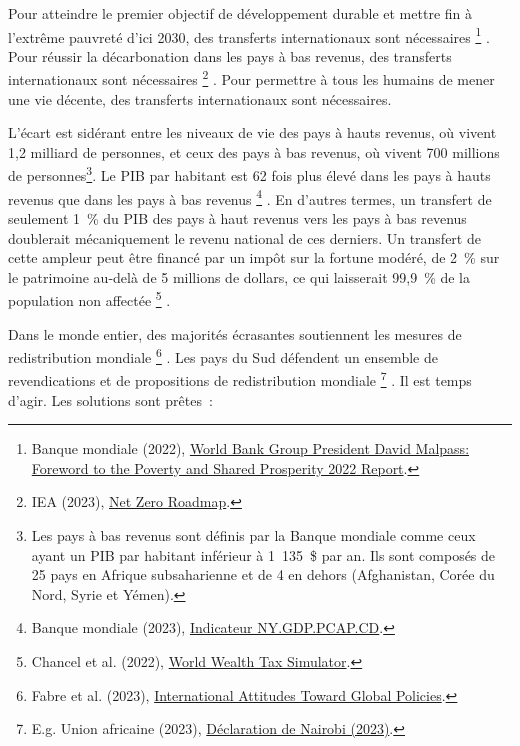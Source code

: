 \documentclass[a5paper,french,openany]{memoir}
\begin{document}
Pour atteindre le premier objectif de développement durable et mettre fin à l'extrême pauvreté d'ici 2030, des transferts internationaux sont nécessaires
\footnote{Banque mondiale (2022), \href{https://www.worldbank.org/en/news/statement/2022/10/05/world-bank-group-president-david-malpass-foreword-to-the-poverty-and-shared-prosperity-report}{World Bank Group President David Malpass: Foreword to the Poverty and Shared Prosperity 2022 Report}.}%
. Pour réussir la décarbonation dans les pays à bas revenus, des transferts internationaux sont nécessaires
\footnote{IEA (2023), \href{https://www.iea.org/reports/net-zero-roadmap-a-global-pathway-to-keep-the-15-0c-goal-in-reach/}{Net Zero Roadmap}.}%
. Pour permettre à tous les humains de mener une vie décente, des transferts internationaux sont nécessaires. 

L'écart est sidérant entre les niveaux de vie des pays à hauts revenus, où vivent 1,2 milliard de personnes, et ceux des pays à bas revenus, où vivent 700 millions de personnes\footnote{Les pays à bas revenus sont définis par la Banque mondiale comme ceux ayant un PIB par habitant %
inférieur à 1~135~\$ par an. Ils sont composés de 25 pays en Afrique subsaharienne et de 4 en dehors (Afghanistan, Corée du Nord, Syrie et Yémen).}. Le PIB par habitant est 62 fois plus élevé dans les pays à hauts revenus que dans les pays à bas revenus
\footnote{Banque mondiale (2023), \href{https://data.worldbank.org/indicator/NY.GDP.PCAP.CD?end=2021\&locations=EU-ZG-XD-XM-1W-IN-US-CD-BI-LU-CN\&start=2021\&view=bar}{Indicateur NY.GDP.PCAP.CD}.}%
. En d'autres termes, un transfert de seulement 1~\% du PIB des pays à haut revenus vers les pays à bas revenus doublerait mécaniquement le revenu national de ces derniers. Un transfert de cette ampleur peut être financé par un impôt sur la fortune modéré, de 2~\% sur le patrimoine au-delà de 5 millions de dollars, ce qui laisserait 99,9~\% de la population non affectée
\footnote{Chancel et al. (2022), \href{https://wid.world/world-wealth-tax-simulator/}{World Wealth Tax Simulator}.}%
.

Dans le monde entier, des majorités écrasantes soutiennent les mesures de redistribution mondiale
\footnote{Fabre et al. (2023), \href{https://papers.ssrn.com/sol3/papers.cfm?abstract\_id=4448523}{International Attitudes Toward Global Policies}.}%
. Les pays du Sud défendent un ensemble de revendications et de propositions de redistribution mondiale
\footnote{E.g. Union africaine (2023), \href{https://media.africaclimatesummit.org/NAIROBI+Declaration+FURTHER+edited+060923+EN+920AM.pdf}{Déclaration de Nairobi (2023)}.}%
. Il est temps d'agir. Les solutions sont prêtes~:
\end{document}
